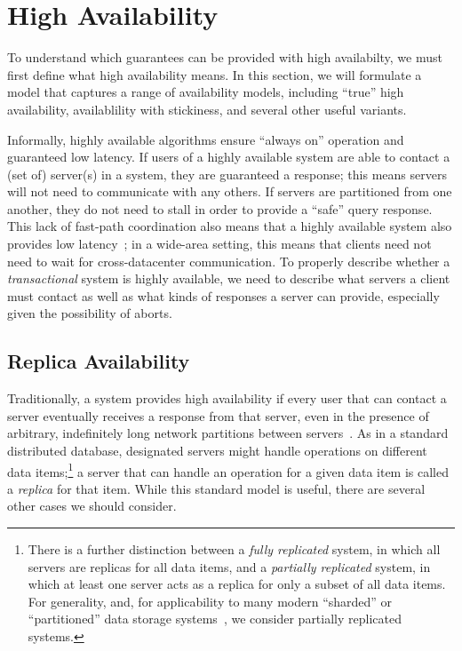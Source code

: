 
\section{High Availability}
\label{sec:availability}

To understand which guarantees can be provided with high availabilty,
we must first define what high availability means. In this section, we
will formulate a model that captures a range of availability models,
including ``true'' high availability, availablility with stickiness,
and several other useful variants.

Informally, highly available algorithms ensure ``always on'' operation
and guaranteed low latency. If users of a highly available system are
able to contact a (set of) server(s) in a system, they are guaranteed
a response; this means servers will not need to communicate with any
others. If servers are partitioned from one another, they do not need
to stall in order to provide a ``safe'' query response. This lack of
fast-path coordination also means that a highly available system also
provides low latency~\cite{abadi-pacelc}; in a wide-area setting, this
means that clients need not need to wait for cross-datacenter
communication. To properly describe whether a \textit{transactional}
system is highly available, we need to describe what servers a client
must contact as well as what kinds of responses a server can provide,
especially given the possibility of aborts.

\subsection{Replica Availability}

Traditionally, a system provides high availability if every user that
can contact a server eventually receives a response from that server,
even in the presence of arbitrary, indefinitely long network
partitions between servers~\cite{gilbert-cap}. As in a standard
distributed database, designated servers might handle operations on
different data items;\footnote{There is a further distinction between
  a \textit{fully replicated} system, in which all servers are
  replicas for all data items, and a \textit{partially replicated}
  system, in which at least one server acts as a replica for only a
  subset of all data items. For generality, and, for applicability to
  many modern ``sharded'' or ``partitioned'' data storage
  systems~\cite{dynamo, pnuts, bigtable, spanner, hstore}, we consider partially
  replicated systems.} a server that can handle an operation for a
given data item is called a \textit{replica} for that item. While this
standard model is useful, there are several other cases we should
consider.

